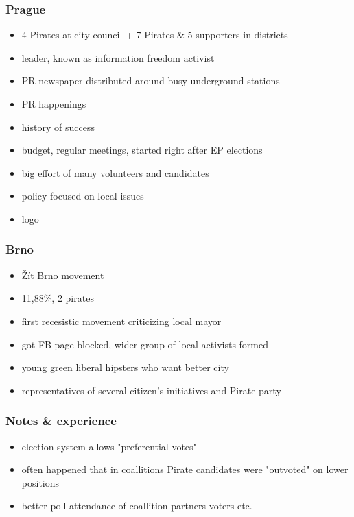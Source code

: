 \begin{frame}
	\frametitle{Prague}
	\begin{itemize}
		\item 4 Pirates at city council + 7 Pirates \& 5 supporters in districts
		\item leader, known as information freedom activist
		\item PR newspaper distributed around busy underground stations
		\item PR happenings
		\item history of success
		\item budget, regular meetings, started right after EP elections
		\item big effort of many volunteers and candidates
		\item policy focused on local issues
		\item logo %
	\end{itemize}
\end{frame}
\begin{frame}
	\frametitle{Brno}
	\begin{itemize}
		\item \v{Z}\'it Brno movement
		\item 11,88\%, 2 pirates
		\item first recesistic movement criticizing local mayor
		\item got FB page blocked, wider group of local activists formed
		\item young green liberal hipsters who want better city
		\item representatives of several citizen's initiatives and Pirate party
	\end{itemize}
\end{frame}
\begin{frame}
	\frametitle{Notes \& experience}
	\begin{itemize}
		\item election system allows "preferential votes"
		\item often happened that in coallitions Pirate candidates were "outvoted" on lower positions
		\item better poll attendance of coallition partners voters etc.
	\end{itemize}
\end{frame}
